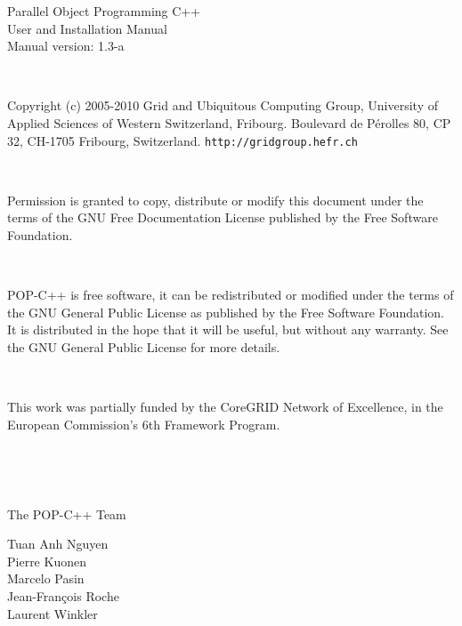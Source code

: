 \parbox{10cm}{%
Parallel Object Programming C++\\
User and Installation Manual\\
Manual version: 1.3-a

~

Copyright (c) 2005-2010 Grid and Ubiquitous Computing Group, University of
Applied Sciences of Western Switzerland, Fribourg. Boulevard de P\'{e}rolles
80, CP 32, CH-1705 Fribourg, Switzerland.
\texttt{http://gridgroup.hefr.ch}

~

Permission is granted to copy, distribute or modify this document
under the terms of the GNU Free Documentation License published by the
Free Software Foundation.

~

POP-C++ is free software, it can be redistributed or modified under the
terms of the GNU General Public License as published by the Free
Software Foundation. It is distributed in the hope that it will be
useful, but without any warranty. See the GNU General Public License for
more details.

~

This work was partially funded by the CoreGRID Network of Excellence, in
the European Commission's 6th Framework Program.

~

~

{The POP-C++ Team}
\begin{flushright}
Tuan Anh Nguyen\\
Pierre Kuonen\\
Marcelo Pasin\\
Jean-Fran\c{c}ois Roche\\
Laurent Winkler\\
\end{flushright}
}
\pagebreak

